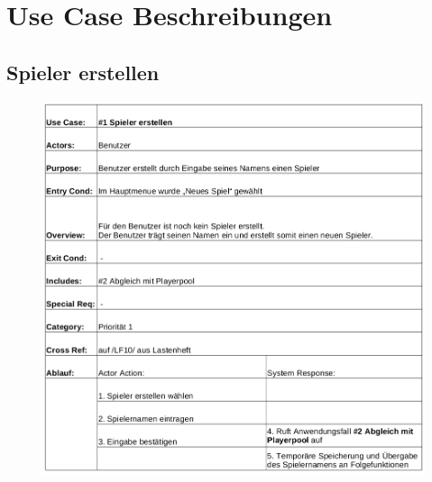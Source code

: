 \clearpage

\chapter{Use Case Beschreibungen}


\section{Spieler erstellen}
\begin{figure}[!h]
	\centering
    \includegraphics[width=\textwidth]{./ucbSpielerErstellen.png}
	\label{}
\end{figure}

